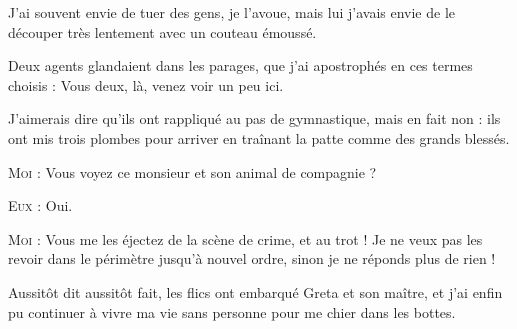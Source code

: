 J’ai souvent envie de tuer des gens, je l’avoue, mais lui j’avais envie de le découper très lentement avec un couteau émoussé.

Deux agents glandaient dans les parages, que j’ai apostrophés en ces termes choisis : Vous deux, là, venez voir un peu ici.

J’aimerais dire qu’ils ont rappliqué au pas de gymnastique, mais en fait non : ils ont mis trois plombes pour arriver en traînant la patte comme des grands blessés.

\begin{dialogue}

\textsc{Moi} : Vous voyez ce monsieur et son animal de compagnie ?

\textsc{Eux} : Oui.

\textsc{Moi} : Vous me les éjectez de la scène de crime, et au trot ! Je ne veux pas les revoir dans le périmètre jusqu’à nouvel ordre, sinon je ne réponds plus de rien !

\end{dialogue}

Aussitôt dit aussitôt fait, les flics ont embarqué Greta et son maître, et j’ai enfin pu continuer à vivre ma vie sans personne pour me chier dans les bottes.

